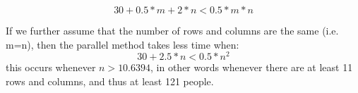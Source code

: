 \documentclass[11pt]{amsart}
\begin{document}
$$
30 + 0.5*m + 2*n < 0.5*m*n
$$

If we further assume that the number of rows and columns are the same (i.e. m=n), then
the parallel method takes less time when:
$$
30 + 2.5*n < 0.5*n^2
$$
this occurs whenever $n > 10.6394$, in other words whenever there are at least 11 rows and columns, and thus at least 121 people.
\end{document}
